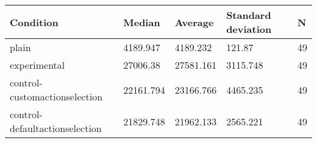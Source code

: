 \begin{center}
\begin{tabular}{|l|l|l|l|l|}
\hline
Condition & Median & Average & Standard deviation & N \\
\hline
plain & 4189.947 & 4189.232 & 121.87 & 49 \\
experimental & 27006.38 & 27581.161 & 3115.748 & 49 \\
control-customactionselection & 22161.794 & 23166.766 & 4465.235 & 49 \\
control-defaultactionselection & 21829.748 & 21962.133 & 2565.221 & 49 \\
\hline
\end{tabular}
\end{center}
